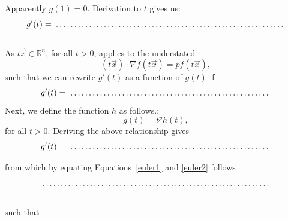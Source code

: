 \begin{Exercise}
Apparently $g(1) = 0$. Derivation to $t$ gives us:\\[0.25cm]
$$
g'(t) = \dotrule{0.80\textwidth}
$$
\\[0.2cm]
As $t \vec{x} \in\mathbb{R}^n$, for all $t>0$, applies to the understated
$$
(t\vec{x}) \cdot \nabla f(t\vec{x}) = pf(t\vec{x}),
$$
such that we can rewrite $g'(t)$ as a function of $g(t)$ if\\[0.25cm]
\begin{equation}
g'(t) =  \dotrule{0.70\textwidth}
\label{euler1}
\end{equation}
Next, we define the function $h$ as follows.:\\[0.25cm]
$$
g(t) = t^p h(t),
$$
for all $t>0$. Deriving the above relationship gives\\[0.25cm]
\begin{equation}
g'(t) =  \dotrule{0.70\textwidth}
\label{euler2}
\end{equation}

from which by equating Equations~\eqref{euler1} and \eqref{euler2} follows \\[0.25cm]
$$
 \dotrule{0.80\textwidth}
$$
\\[0.2cm]such that  \vspace*{0.5cm}

\vspace*{0.5cm}

\vspace*{0.5cm}

\vspace*{0.5cm}

\end{Exercise} 

